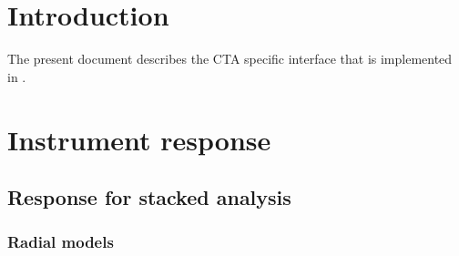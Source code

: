 \documentclass{article}[12pt,a4]
\begin{document}
\frontpage


\section{Introduction}

The present document describes the CTA specific interface that is implemented in \this.



\section{Instrument response}

\subsection{Response for stacked analysis}

\subsubsection{Radial models}
\end{document}
